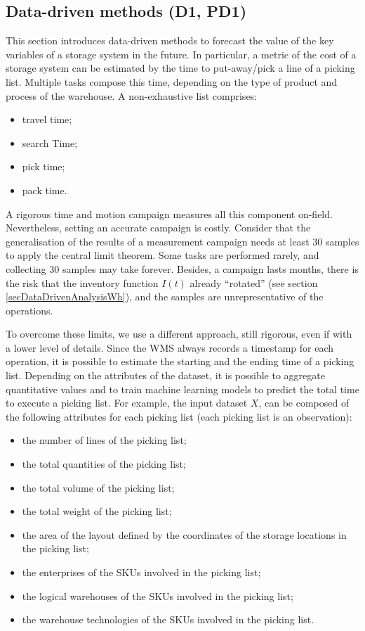\subsection{Data-driven methods (D1, PD1)}
This section introduces data-driven methods to forecast the value of the key variables of a storage system in the future. In particular, a metric of the cost of a storage system can be estimated by the time to put-away/pick a line of a picking list. Multiple tasks compose this time, depending on the type of product and process of the warehouse. A non-exhaustive list comprises:
\begin{itemize}
    \item travel time;
    \item search Time;
    \item pick time;
    \item pack time.

\end{itemize}

A rigorous time and motion campaign measures all this component on-field. Nevertheless, setting an accurate campaign is costly. Consider that the generalisation of the results of a measurement campaign needs at least 30 samples to apply the central limit theorem. Some tasks are performed rarely, and collecting 30 samples may take forever. Besides, a campaign lasts months, there is the risk that the inventory function $I(t)$ already “rotated” (see section \ref{secDataDrivenAnalysisWh}), and the samples are unrepresentative of the operations. 

To overcome these limits, we use a different approach, still rigorous, even if with a lower level of details. Since the WMS always records a timestamp for each operation, it is possible to estimate the starting and the ending time of a picking list. Depending on the attributes of the dataset, it is possible to aggregate quantitative values and to train machine learning models to predict the total time to execute a picking list. For example, the input dataset $X$, can be composed of the following attributes for each picking list (each picking list is an observation):

\begin{itemize}
    \item the number of lines of the picking list;
    \item the total quantities of the picking list;
    \item the total volume of the picking list;
    \item the total weight of the picking list;
    \item the area of the layout defined by the coordinates of the storage locations in the picking list;
    \item the enterprises of the SKUs involved in the picking list;
    \item the logical warehouses of the SKUs involved in the picking list;
    \item the warehouse technologies of the SKUs involved in the picking list.

\end{itemize}

